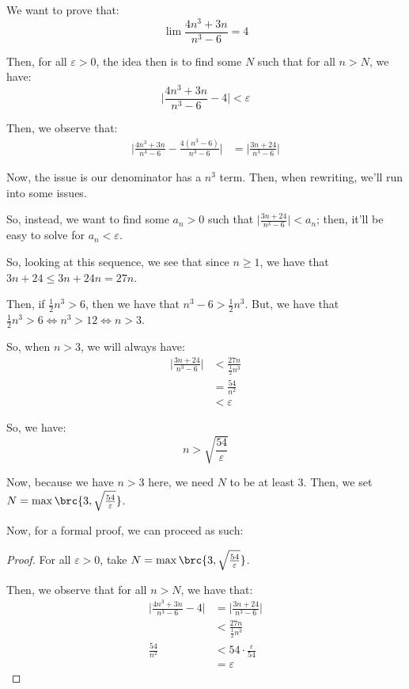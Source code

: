 \documentclass[openany]{book}
\begin{document}
\begin{example}
	We want to prove that:
	\begin{equation*}
		\lim \frac{4n^{3} + 3n}{n^{3} - 6} = 4
	\end{equation*}
	
	Then, for all $\varepsilon > 0$, the idea then is to find some $N$ such that for all $n > N$, we have:
	\begin{equation*}
		\lvert \frac{4n^{3} + 3n}{n^{3} - 6} - 4 \rvert < \varepsilon
	\end{equation*}
	
	Then, we observe that:
	\begin{align*}
		\lvert \frac{4n^{3} + 3n}{n^{3} - 6} - \frac{4(n^{3} - 6)}{n^{3} - 6} \rvert &= \lvert \frac{3n+24}{n^{3} - 6} \rvert
	\end{align*}
	
	Now, the issue is our denominator has a $n^{3}$ term. Then, when rewriting, we'll run into some issues.
	
	So, instead, we want to find some $a_n > 0$ such that $\lvert \frac{3n+24}{n^{3} - 6} \rvert < a_n$; then, it'll be easy to solve for $a_n < \varepsilon$.
	
	So, looking at this sequence, we see that since $n \geq 1$, we have that $3n + 24 \leq 3n + 24n = 27n$.
	
	Then, if $\frac{1}{2}n^{3} > 6$, then we have that $n^{3} - 6 > \frac{1}{2}n^{3}$. But, we have that $\frac{1}{2}n^{3} > 6 \iff n^{3} > 12 \iff n > 3$.
	
	So, when $n > 3$, we will always have:
	\begin{align*}
		\lvert \frac{3n+24}{n^{3} - 6} \rvert &< \frac{27n}{\frac{1}{2}n^{3}} \\
		&= \frac{54}{n^{2}} \\
		&< \varepsilon
	\end{align*}
	
	So, we have:
	\begin{equation*}
		n > \sqrt{\frac{54}{\varepsilon}}
	\end{equation*}
	
	Now, because we have $n > 3$ here, we need $N$ to be at least $3$. Then, we set $N = \max\brc{3, \sqrt{\frac{54}{\varepsilon}}}$.
	
	Now, for a formal proof, we can proceed as such:
	\begin{proof}
		For all $\varepsilon > 0$, take $N = \max\brc{3, \sqrt{\frac{54}{\varepsilon}}}$.
		
		Then, we observe that for all $n > N$, we have that:
		\begin{align*}
			\lvert \frac{4n^{3} + 3n}{n^{3} - 6} - 4 \rvert &= \lvert \frac{3n+24}{n^{3} - 6} \rvert \\
			&< \frac{27n}{\frac{1}{2}n^{3}} \\
			\frac{54}{n^{2}} &< 54 \cdot \frac{\varepsilon}{54} \\
			&= \varepsilon
		\end{align*}
	\end{proof}
\end{example}
\end{document}
